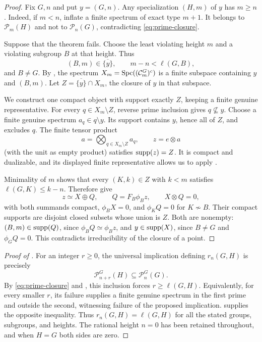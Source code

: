 \begin{proof}
Fix \(G,n\) and put \(y=(G,n)\). Any specialization \((H,m)\) of
\(y\) has \(m\ge n\). Indeed, if \(m<n\), inflate a finite spectrum
of exact type \(m+1\). It belongs to \(\mathcal P_m(H)\) and not to
\(\mathcal P_n(G)\), contradicting \eqref{eq:prime-closure}.

Suppose that the theorem fails. Choose the least violating height \(m\)
and a violating subgroup \(B\) at that height. Thus
\[
 (B,m)\in\overline{\{y\}},\qquad m-n<\ell(G,B),
\]
and \(B\ne G\). By , the spectrum
\(X_m=\operatorname{Spc}((\mathcal C_m^G)^c)\) is a finite subspace containing
\(y\) and \((B,m)\). Let \(Z=\overline{\{y\}}\cap X_m\), the
closure of \(y\) in that subspace.

We construct one compact object with support exactly \(Z\), keeping a
finite genuine representative. For every \(q\in X_m\setminus Z\),
reverse prime inclusion gives \(q\not\subseteq y\). Choose a finite
genuine spectrum \(a_q\in q\setminus y\). Its support contains \(y\),
hence all of \(Z\), and excludes \(q\). The finite tensor product
\[
 a=\bigotimes_{q\in X_m\setminus Z}a_q,\qquad z=e\otimes a
\]
(with the unit as empty product) satisfies \(\operatorname{supp}(z)=Z\).
It is compact and dualizable, and its displayed finite representative
allows us to apply .

Minimality of \(m\) shows that every \((K,k)\in Z\) with \(k<m\)
satisfies \(\ell(G,K)\le k-n\). Therefore
 give
\[
 z\simeq X\oplus Q,\qquad
 Q=F_B\phi_Bz,\qquad X\otimes Q=0,
\]
with both summands compact, \(\phi_BX=0\), and
\(\phi_KQ=0\) for \(K\not\sim B\). Their compact supports are
disjoint closed subsets whose union is \(Z\). Both are nonempty:
\((B,m)\in\operatorname{supp}(Q)\), since \(\phi_BQ\simeq\phi_Bz\), and
\(y\in\operatorname{supp}(X)\), since \(B\ne G\) and \(\phi_GQ=0\).
This contradicts irreducibility of the closure of a point.
\end{proof}

\begin{proof}[Proof of ]
For an integer \(r\ge0\), the universal implication defining
\(r_n(G,H)\) is precisely
\[
 \mathcal P_{n+r}^G(H)\subseteq\mathcal P_n^G(G).
\]
By \eqref{eq:prime-closure} and , this inclusion
forces \(r\ge\ell(G,H)\). Equivalently, for every smaller \(r\), its
failure supplies a finite genuine spectrum in the first prime and outside
the second, witnessing failure of the proposed implication.
 supplies the opposite inequality. Thus
\(r_n(G,H)=\ell(G,H)\) for all the stated groups, subgroups, and heights.
The rational height \(n=0\) has been retained throughout, and when
\(H=G\) both sides are zero.
\end{proof}

